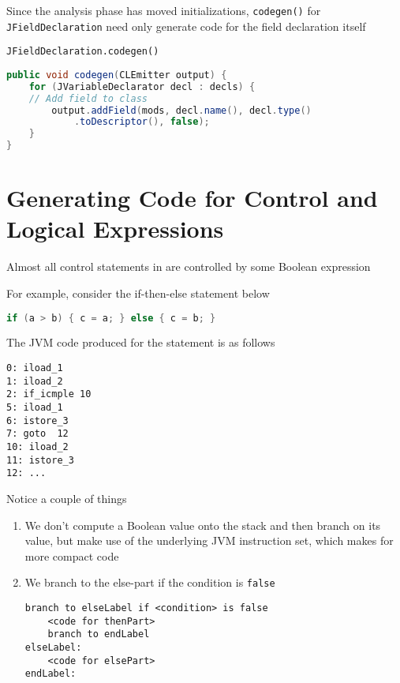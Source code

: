 \documentclass[8pt,a4paper,compress]{beamer}
\begin{document}
\begin{frame}[fragile]
\pause

Since the analysis phase has moved initializations, \lstinline{codegen()} for \lstinline{JFieldDeclaration} need only generate code for the field declaration itself

\pause
\bigskip

\lstinline{JFieldDeclaration.codegen()}
\begin{lstlisting}[language=Java]
public void codegen(CLEmitter output) {
    for (JVariableDeclarator decl : decls) {
	// Add field to class
        output.addField(mods, decl.name(), decl.type()
            .toDescriptor(), false);
    }
}
\end{lstlisting}
\end{frame}

\section{Generating Code for Control and Logical Expressions}
\begin{frame}[fragile]
\pause

Almost all control statements in \jmm are controlled by some Boolean expression

\pause
\bigskip

For example, consider the if-then-else statement below
\begin{lstlisting}[language=Java]
if (a > b) { c = a; } else { c = b; }
\end{lstlisting}

The JVM code produced for the statement is as follows
\begin{lstlisting}[language={}]
0: iload_1
1: iload_2
2: if_icmple 10
5: iload_1
6: istore_3
7: goto  12
10: iload_2
11: istore_3
12: ...
\end{lstlisting}

\pause
\bigskip

Notice a couple of things
\begin{enumerate}
\item We don't compute a Boolean value onto the stack and then branch on its value, but make use of the underlying JVM instruction set, which makes for more compact code

\item We branch to the else-part if the condition is \lstinline{false}
\begin{lstlisting}[language={}]
branch to elseLabel if <condition> is false
    <code for thenPart>
    branch to endLabel
elseLabel:
    <code for elsePart>
endLabel:
\end{lstlisting}
\end{enumerate}
\end{frame}
\end{document}
